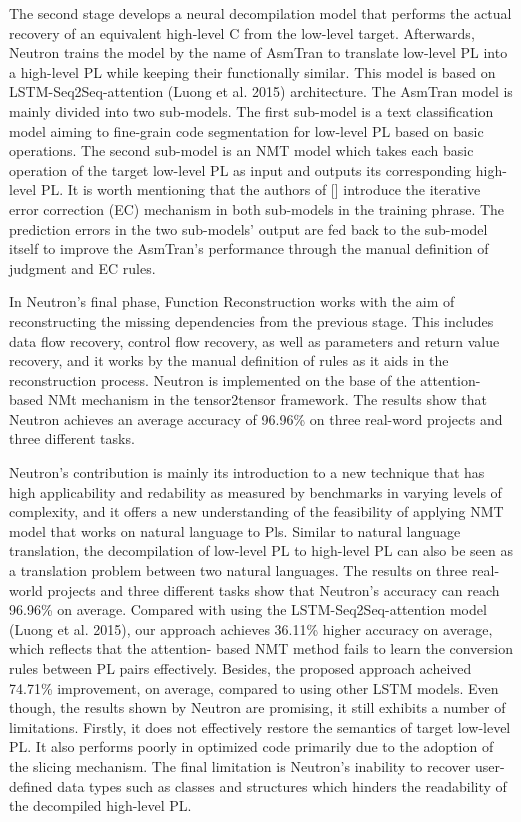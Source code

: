 \documentclass[conference,a4paper]{IEEEtran}
\begin{document}
The second stage develops a neural decompilation model that performs the actual recovery of an equivalent high-level C from the low-level target. Afterwards, Neutron trains the model by the name of AsmTran to translate low-level PL into a high-level PL while keeping their functionally similar. This model is based on LSTM-Seq2Seq-attention (Luong et al. 2015) architecture. The AsmTran model is mainly divided into two sub-models. The first sub-model is a text classification model aiming to fine-grain code segmentation for low-level PL based on basic operations. The second sub-model is an NMT model which takes each basic operation of the target low-level PL as input and outputs its corresponding high-level PL. It is worth mentioning that the authors of [] introduce the iterative error correction (EC) mechanism in both sub-models in the training phrase. The prediction errors in the two sub-models’ output are fed back to the sub-model itself to improve the AsmTran’s performance through the manual definition of judgment and EC rules.

In Neutron’s final phase, Function Reconstruction works with the aim of reconstructing the missing dependencies from the previous stage. This includes data flow recovery, control flow recovery, as well as parameters and return value recovery, and it works by the manual definition of rules as it aids in the reconstruction process. Neutron is implemented on the base of the attention-based NMt mechanism in the tensor2tensor framework. The results show that Neutron achieves an average accuracy of 96.96\% on three real-word projects and three different tasks.

Neutron’s contribution is mainly its introduction to a new technique that has high applicability and redability as measured by benchmarks in varying levels of complexity, and it offers a new understanding of the feasibility of applying NMT model that works on natural language to Pls. Similar to natural language translation, the decompilation of low-level PL to high-level PL can also be seen as a translation problem between two natural languages. The results on three real-world projects and three different tasks show that Neutron’s accuracy can reach 96.96\% on average. Compared with using the LSTM-Seq2Seq-attention model (Luong et al. 2015), our approach achieves 36.11\% higher accuracy on average, which reflects that the attention- based NMT method fails to learn the conversion rules between PL pairs effectively. Besides, the proposed approach acheived 74.71\% improvement, on average, compared to using other LSTM models. Even though, the results shown by Neutron are promising, it still exhibits a number of limitations. Firstly, it does not effectively restore the semantics of target low-level PL. It also performs poorly in optimized code primarily due to the adoption of the slicing mechanism. The final limitation is Neutron’s inability to recover user-defined data types such as classes and structures which hinders the readability of the decompiled high-level PL.
\end{document}
